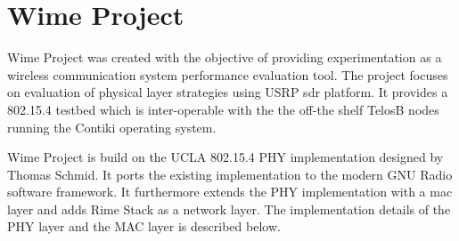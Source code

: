\section{Wime Project}
Wime Project was created with the objective of providing experimentation as a wireless communication system performance evaluation tool.
The project focuses on evaluation of physical layer strategies using USRP \ac{sdr} platform.
It provides a 802.15.4 testbed which is inter-operable with the the off-the shelf TelosB nodes running the Contiki operating system.

Wime Project is build on the UCLA 802.15.4 PHY implementation designed  by Thomas Schmid.
It ports the existing implementation to the modern GNU Radio software framework.
It furthermore extends the PHY implementation with a \ac{mac} layer and adds Rime Stack as a network layer.
The implementation details of the PHY layer and the MAC layer is described below.\\

